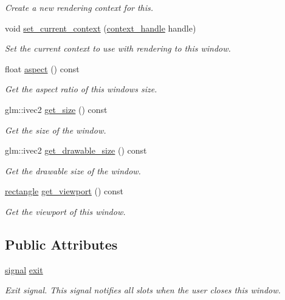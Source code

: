 \begin{DoxyCompactItemize}
\begin{DoxyCompactList}\small\item\em Create a new rendering context for this. \end{DoxyCompactList}\item 
void \mbox{\hyperlink{classmoka_1_1window_a3168db6a019dd13ffc242c8860916264}{set\+\_\+current\+\_\+context}} (\mbox{\hyperlink{structmoka_1_1context__handle}{context\+\_\+handle}} handle)
\begin{DoxyCompactList}\small\item\em Set the current context to use with rendering to this window. \end{DoxyCompactList}\item 
float \mbox{\hyperlink{classmoka_1_1window_a7517a29909b0b315b36db0b49ca7ddc3}{aspect}} () const
\begin{DoxyCompactList}\small\item\em Get the aspect ratio of this window\textquotesingle{}s size. \end{DoxyCompactList}\item 
glm\+::ivec2 \mbox{\hyperlink{classmoka_1_1window_a496c3e765a752526d2bfea47891846ab}{get\+\_\+size}} () const
\begin{DoxyCompactList}\small\item\em Get the size of the window. \end{DoxyCompactList}\item 
glm\+::ivec2 \mbox{\hyperlink{classmoka_1_1window_af4c71117b5eddc347d5172bc26f3cb73}{get\+\_\+drawable\+\_\+size}} () const
\begin{DoxyCompactList}\small\item\em Get the drawable size of the window. \end{DoxyCompactList}\item 
\mbox{\hyperlink{namespacemoka_ab5e90635f0a0441cc99f2328bc34500d}{rectangle}} \mbox{\hyperlink{classmoka_1_1window_aa01c0e44f28b0253ecf376c999e5f74f}{get\+\_\+viewport}} () const
\begin{DoxyCompactList}\small\item\em Get the viewport of this window. \end{DoxyCompactList}\end{DoxyCompactItemize}
\subsection*{Public Attributes}
\begin{DoxyCompactItemize}
\item 
\mbox{\hyperlink{classmoka_1_1signal}{signal}} \mbox{\hyperlink{classmoka_1_1window_aafcb86998fd7046a82e9abfcb0b2b21c}{exit}}
\begin{DoxyCompactList}\small\item\em Exit signal. This signal notifies all slots when the user closes this window. \end{DoxyCompactList}\end{DoxyCompactItemize}


